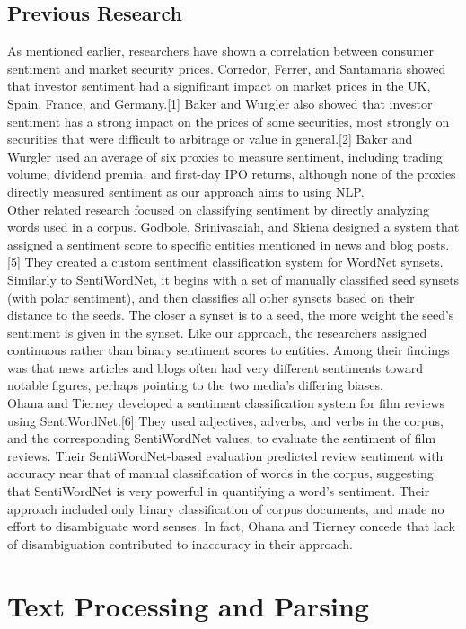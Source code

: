 \documentclass[pageno]{jpaper}
\begin{document}
\subsection{Previous Research}
\indent As mentioned earlier, researchers have shown a correlation between consumer sentiment and market security prices. Corredor, Ferrer, and Santamaria showed that investor sentiment had a significant impact on market prices in the UK, Spain, France, and Germany.[1] Baker and Wurgler also showed that investor sentiment has a strong impact on the prices of some securities, most strongly on securities that were difficult to arbitrage or value in general.[2] Baker and Wurgler used an average of six proxies to measure sentiment, including trading volume, dividend premia, and first-day IPO returns, although none of the proxies directly measured sentiment as our approach aims to using NLP. \\
\indent Other related research focused on classifying sentiment by directly analyzing words used in a corpus. Godbole, Srinivasaiah, and Skiena designed a system that assigned a sentiment score to specific entities mentioned in news and blog posts.[5] They created a custom sentiment classification system for WordNet synsets. Similarly to SentiWordNet, it begins with a set of manually classified seed synsets (with polar sentiment), and then classifies all other synsets based on their distance to the seeds. The closer a synset is to a seed, the more weight the seed's sentiment is given in the synset. Like our approach, the researchers assigned continuous rather than binary sentiment scores to entities. Among their findings was that news articles and blogs often had very different sentiments toward notable figures, perhaps pointing to the two media's differing biases. \\
\indent Ohana and Tierney developed a sentiment classification system for film reviews using SentiWordNet.[6] They used adjectives, adverbs, and verbs in the corpus, and the corresponding SentiWordNet values, to evaluate the sentiment of film reviews. Their SentiWordNet-based evaluation predicted review sentiment with accuracy near that of manual classification of words in the corpus, suggesting that SentiWordNet is very powerful in quantifying a word's sentiment. Their approach included only binary classification of corpus documents, and made no effort to disambiguate word senses. In fact, Ohana and Tierney concede that lack of disambiguation contributed to inaccuracy in their approach.
\section{Text Processing and Parsing}
\end{document}
